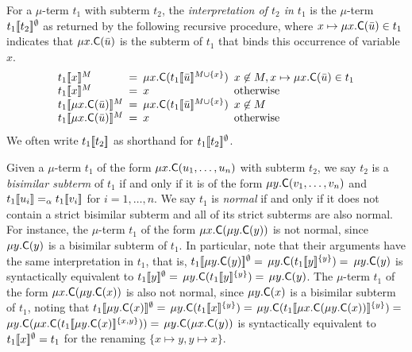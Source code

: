For a $\mu$-term $t_1$ with subterm $t_2$,
the \emph{interpretation of $t_2$ in $t_1$} is the $\mu$-term $t_1[\![ t_2 ]\!]^\emptyset$ as returned by the following recursive procedure,
where $x \mapsto \mu x. \textsf{C}( \bar u ) \in t_1$ indicates that $\mu x. \textsf{C}( \bar u )$ is the subterm of $t_1$ that binds this occurrence of variable $x$.
\[\begin{array}{l@{\hspace{.5em}}l@{\hspace{.5em}}l@{\hspace{.5em}}l}
t_1\interp{x}^M & = & \mu x. \const{C}( t_1\interp{ \vec u}^{M \cup \{ x \}}) & x \not\in M, x \mapsto \mu x. \const{C}( \vec u ) \in t_1  \\
t_1\interp{x}^M & = & x & \text{otherwise} \\
t_1\interp{\mu x. \const{C}( \vec u )}^M & = & \mu x. \const{C}( t_1\interp{ \vec u }^{M \cup \{ x \}} ) & x \not\in M \\
t_1\interp{\mu x. \const{C}( \vec u )}^M & = & x & \text{otherwise}
\end{array}\]
We often write $t_1[\![ t_2 ]\!]$ as shorthand for $t_1[\![ t_2 ]\!]^\emptyset$.

Given a $\mu$-term $t_1$ of the form $\mu x. \textsf{C}( u_1, \ldots, u_n )$ with subterm $t_2$,
we say $t_2$ is a \emph{bisimilar subterm} of $t_1$ if and only if it is of the form
$\mu y. \textsf{C}( v_1, \ldots, v_n )$ and $t_1[\![  u_i  ]\!] \mathrel{=_\alpha} t_1[\![  v_i  ]\!]$ for $i = 1,\ldots, n$.
We say $t_1$ is \emph{normal} if and only if it does not contain a strict bisimilar subterm
and all of its strict subterms are also normal.
For instance, the $\mu$-term $t_1$ of the form $\mu x. \textsf{C}( \mu y. \textsf{C}( y ) )$ is not normal,
since $\mu y. \textsf{C}( y )$ is a bisimilar subterm of $t_1$.
In particular, note that their arguments have the same interpretation in $t_1$,
that is,
$t_1[\![ \mu y. \textsf{C}( y ) ]\!]^\emptyset =$
$\mu y. \textsf{C}( t_1[\![ y ]\!]^{\{y\}} ) =$
$\mu y. \textsf{C}( y )$
is syntactically equivalent to
$t_1[\![ y ]\!]^\emptyset =$
$\mu y. \textsf{C}( t_1[\![ y ]\!]^{\{y\}} ) =$
$\mu y. \textsf{C}( y )$.
The $\mu$-term $t_1$ of the form $\mu x. \textsf{C}( \mu y. \textsf{C}( x ) )$ is also not normal,
since $\mu y. \textsf{C}( x )$ is a bisimilar subterm of $t_1$,
noting that
$t_1[\![ \mu y. \textsf{C}( x ) ]\!]^\emptyset =$
$\mu y. \textsf{C}( t_1[\![ x ]\!]^{\{y\}} ) =$
$\mu y. \textsf{C}( t_1[\![ \mu x. \textsf{C}( \mu y. \textsf{C}( x ) )  ]\!]^{\{y\}} ) =$
$\mu y. \textsf{C}( \mu x. \textsf{C}( t_1[\![ \mu y. \textsf{C}( x ) ]\!]^{\{x,y\}} ) ) =$
$\mu y. \textsf{C}( \mu x. \textsf{C}( y ) )$
is syntactically equivalent to $t_1[\![ x ]\!]^\emptyset = t_1$ for the renaming $\{ x \mapsto y, y \mapsto x \}$.


